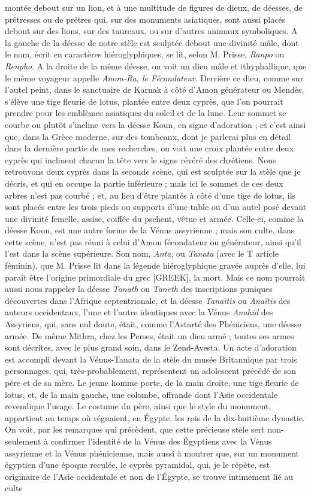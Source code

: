 \documentclass[a4paper, 11pt, oneside, polutonikogreek, french]{article}
\begin{document}
montée debout sur un lion, et à une multitude de figures de dieux, de déesses, de prêtresses ou de prêtres qui, sur des monuments asiatiques, sont aussi placés debout sur des lions, sur des taureaux, ou sur d'autres animaux symboliques. A la gauche de la déesse de notre stèle est sculptée debout une divinité mâle, dont le nom, écrit en caractères hiéroglyphiques, se lit, selon M. Prisse, \emph{Ranpo} ou \emph{Renpho}. A la droite de la même déesse, on voit un dieu mâle et ithyphallique, que le même voyageur appelle \emph{Amon-Ra, le Fécondateur}. Derrière ce dieu, comme sur l'autel peint, dans le sanctuaire de Karnak à côté d'Amon générateur ou Mendès, s'élève une tige fleurie de lotus, plantée entre deux cyprès, que l'on pourrait prendre pour les emblèmes asiatiques du soleil et de la lune. Leur sommet se courbe ou plutôt s'incline vers la déesse Koun, en signe d'adoration ; et c'est ainsi que, dans la Grèce moderne, sur des tombeanx, dont je parlerai plus en détail dans la dernière partie de mes recherches, on voit une croix plantée entre deux cyprès qui inclinent chacun la tête vers le signe révéré des chrétiens. Nous retrouvons deux cyprès dans la seconde scène, qui est sculptée sur la stèle que je décris, et qui en occupe la partie inférieure ; mais ici le sommet de ces deux arbres n'est pas courbé ; et, au lieu d'être plantés à côté d'une tige de lotus, ils sont placés entre les trois pieds ou supports d'une table ou d'un autel posé devant une divinité femelle, assise, coiffée du pschent, vêtue et armée. Celle-ci, comme la déesse Koun, est une autre forme de la Vénus assyrienne ; mais son culte, dans cette scène, n'est pas réuni à celui d'Amon fécondateur ou générateur, ainsi qu'il l'est dans la scène supérieure. Son nom, \emph{Anta}, ou \emph{Tanata} (avec le T article féminin), que M. Prisse lit dans la légende hiéroglyphique gravée auprès d'elle, lui paraît être l'origine primordiale du grec [GREEK], la mort. Mais ce nom pourrait aussi nous rappeler la déesse \emph{Tanath} ou \emph{Taneth} des inscriptions puniques découvertes dans l'Afrique septentrionale, et la déesse \emph{Tanaïtis} ou \emph{Anaïtis} des auteurs occidentaux, l'une et l'autre identiques avec la Vénus \emph{Anahid} des Assyriens, qui, sans nul doute, était, comme l'Astarté des Phéniciens, une déesse armée. De même Mithra, chez les Perses, était un dieu armé ; toutes ses armes sont décrites, avec le plus grand soin, dans le Zend-Avesta. Un acte d'adoration est accompli devant la Vénus-Tanata de la stèle du musée Britannique par trois personnages, qui, très-probablement, représentent un adolescent précédé de son père et de sa mère. Le jeune homme porte, de la main droite, une tige fleurie de lotus, et, de la main gauche, une colombe, offrande dont l'Asie occidentale revendique l'usage. Le costume du père, ainsi que le style du monument, appartient au temps où régnaient, en Égypte, les rois de la dix-huitième dynastie. On voit, par les remarques qui précèdent, que cette précieuse stèle sert non-seulement à confirmer l'identité de la Vénus des Égyptiens avec la Vénus assyrienne et la Vénus phénicienne, mais aussi à montrer que, sur un monument égyptien d'une époque reculée, le cyprès pyramidal, qui, je le répète, est originaire de l'Asie occidentale et non de l'Égypte, se trouve intimement lié au culte 
\end{document}
